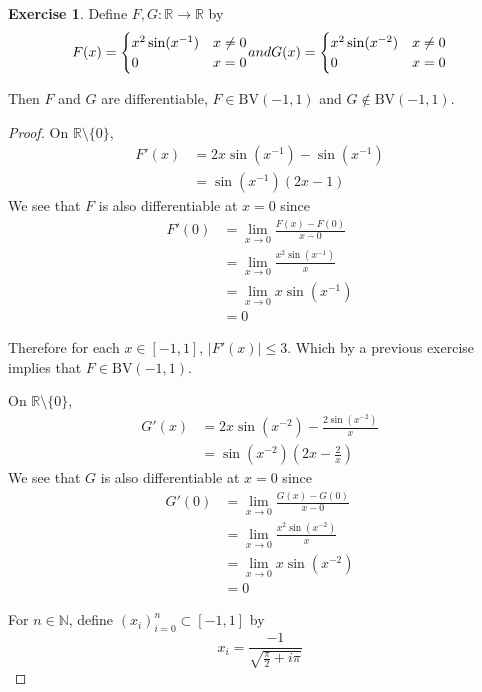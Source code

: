 \documentclass{book}
\theoremstyle{definition}
\newtheorem{ex}[definition]{Exercise}
\newcommand{\N}{\mathbb{N}}
\newcommand{\R}{\mathbb{R}}
\newcommand{\lex}[1]{\label{ex:#1}}
\DeclareMathOperator*{\0}{\mbf{0}}
\DeclareMathOperator*{\1}{\mbf{1}}
\newcommand{\BV}{\text{BV}}
\begin{document}
	\begin{ex} \lex{00000} 
		Define $F,G:\R \rightarrow \R$ by 
		\[ F(x) = \begin{cases}
			x^2 \sin(x^{-1}) & x \neq 0\\
			0 & x=0\\
		\end{cases}$$ and $$G(x)=
		\begin{cases}
			x^2 \sin(x^{-2}) & x \neq 0\\
			0 & x=0
		\end{cases}
		\]
		
		Then $F$ and $G$ are differentiable, $F \in \BV(-1,1)$ and $G \not \in \BV(-1,1)$.
	\end{ex}
	
	\begin{proof}
		On $\R \setminus \{0\}$, 
		\begin{align*}
			F'(x) 
			&= 2x \sin(x^{-1})- \sin(x^{-1})\\
			&= \sin(x^{-1})(2x-1)
		\end{align*} We see that $F$ is also differentiable at $x=0$ since 
		\begin{align*}
			F'(0) 
			&= \lim_{x \rightarrow 0} \frac{F(x)-F(0)}{x-0}\\
			&= \lim_{x \rightarrow 0} \frac{x^2 \sin(x^{-1})}{x}\\
			&= \lim_{x \rightarrow 0} x \sin(x^{-1})\\
			&=0
		\end{align*}
		
		Therefore for each $x \in [-1,1]$, $|F'(x)| \leq 3$. Which by a previous exercise implies that $F \in \BV(-1,1)$.
		
		On $\R \setminus \{0\}$, 
		\begin{align*}
			G'(x)
			&= 2x \sin(x^{-2})-\frac{2 \sin(x^{-2})}{x}\\
			&= \sin(x^{-2})(2x-\frac{2}{x})
		\end{align*}
		We see that $G$ is also differentiable at $x=0$ since 
		\begin{align*}
			G'(0) 
			&= \lim_{x \rightarrow 0} \frac{G(x)-G(0)}{x-0}\\
			&= \lim_{x \rightarrow 0} \frac{x^2 \sin(x^{-2})}{x}\\
			&= \lim_{x \rightarrow 0} x \sin(x^{-2})\\
			&=0
		\end{align*}
		
		For $n \in \N$, define $(x_i)_{i=0}^n \subset [-1,1]$ by $$x_i= \frac{-1}{\sqrt{\frac{\pi}{2}+i\pi}}$$
		

\end{proof}
\end{document}

